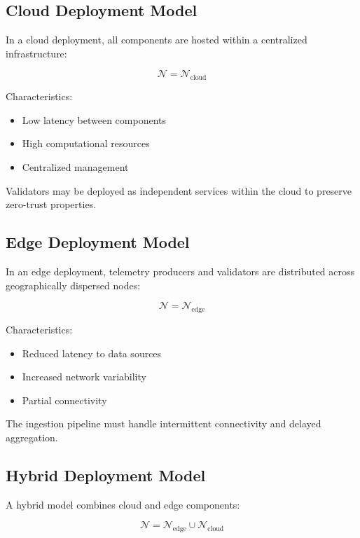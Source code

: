 \subsection{Cloud Deployment Model}

In a cloud deployment, all components are hosted within a centralized infrastructure:

\begin{equation}
\mathcal{N} = \mathcal{N}_{\text{cloud}}
\end{equation}

Characteristics:
\begin{itemize}
\item Low latency between components
\item High computational resources
\item Centralized management
\end{itemize}

Validators may be deployed as independent services within the cloud to preserve zero-trust properties.

\subsection{Edge Deployment Model}

In an edge deployment, telemetry producers and validators are distributed across geographically dispersed nodes:

\begin{equation}
\mathcal{N} = \mathcal{N}_{\text{edge}}
\end{equation}

Characteristics:
\begin{itemize}
\item Reduced latency to data sources
\item Increased network variability
\item Partial connectivity
\end{itemize}

The ingestion pipeline must handle intermittent connectivity and delayed aggregation.

\subsection{Hybrid Deployment Model}

A hybrid model combines cloud and edge components:

\begin{equation}
\mathcal{N} = \mathcal{N}_{\text{edge}} \cup \mathcal{N}_{\text{cloud}}
\end{equation}

